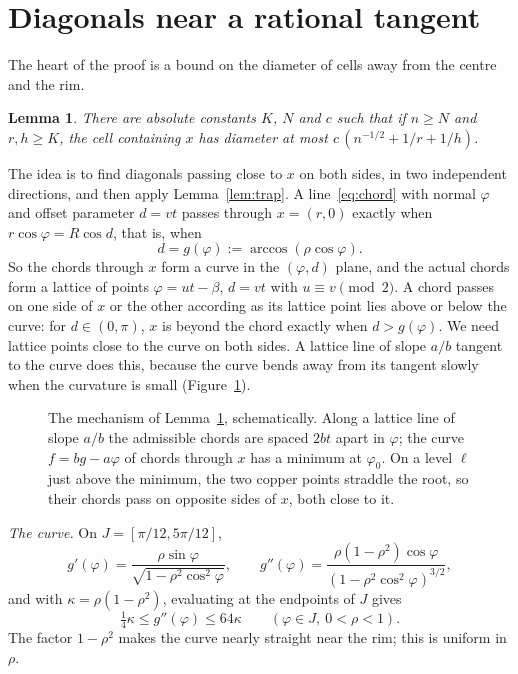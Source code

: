 \documentclass[11pt]{amsart}
\newtheorem{lemma}[theorem]{Lemma}
\theoremstyle{remark}
\begin{document}
\section{Diagonals near a rational tangent}

The heart of the proof is a bound on the diameter of cells away from the centre and the rim.

\begin{lemma}\label{lem:tangent}
There are absolute constants $K$, $N$ and $c$ such that if $n\ge N$ and $r,h\ge K$, the cell containing $x$ has diameter at most $c\,(n^{-1/2}+1/r+1/h)$.
\end{lemma}

The idea is to find diagonals passing close to $x$ on both sides, in two independent directions, and then apply Lemma~\ref{lem:trap}. A line~\eqref{eq:chord} with normal $\varphi$ and offset parameter $d=vt$ passes through $x=(r,0)$ exactly when $r\cos\varphi=R\cos d$, that is, when
\[
d=g(\varphi):=\arccos(\rho\cos\varphi).
\]
So the chords through $x$ form a curve in the $(\varphi,d)$ plane, and the actual chords form a lattice of points $\varphi=ut-\beta$, $d=vt$ with $u\equiv v\pmod 2$. A chord passes on one side of $x$ or the other according as its lattice point lies above or below the curve: for $d\in(0,\pi)$, $x$ is beyond the chord exactly when $d>g(\varphi)$. We need lattice points close to the curve on both sides. A lattice line of slope $a/b$ tangent to the curve does this, because the curve bends away from its tangent slowly when the curvature is small (Figure~\ref{fig:tangent}).

\begin{figure}[ht]
\centering

\caption{The mechanism of Lemma~\ref{lem:tangent}, schematically. Along a lattice line of slope $a/b$ the admissible chords are spaced $2bt$ apart in $\varphi$; the curve $f=bg-a\varphi$ of chords through $x$ has a minimum at $\varphi_0$. On a level $\ell$ just above the minimum, the two copper points straddle the root, so their chords pass on opposite sides of $x$, both close to it.}
\label{fig:tangent}
\end{figure}

\emph{The curve.} On $J=[\pi/12,5\pi/12]$,
\[
g'(\varphi)=\frac{\rho\sin\varphi}{\sqrt{1-\rho^2\cos^2\varphi}},\qquad
g''(\varphi)=\frac{\rho(1-\rho^2)\cos\varphi}{(1-\rho^2\cos^2\varphi)^{3/2}},
\]
and with $\kappa=\rho(1-\rho^2)$, evaluating at the endpoints of $J$ gives
\begin{equation}\label{eq:curv}
\tfrac14\kappa\le g''(\varphi)\le64\kappa\qquad(\varphi\in J,\ 0<\rho<1).
\end{equation}
The factor $1-\rho^2$ makes the curve nearly straight near the rim; this is uniform in $\rho$.
\end{document}
